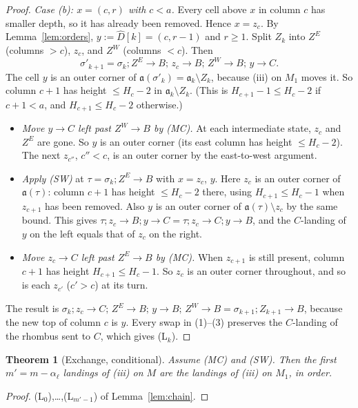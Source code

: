 \documentclass[11pt]{article}
\newtheorem{theorem}{Theorem}
\theoremstyle{definition}
\newcommand{\toB}{\!\to\! B}
\newcommand{\toC}{\!\to\! C}
\newcommand{\fa}{\mathfrak a}
\begin{document}
\begin{proof}
\noindent\emph{Case (b): $x=(c,r)$ with $c<a$.} Every cell above $x$ in column $c$ has smaller depth, so it has already been
removed. Hence $x=z_c$. By Lemma~\ref{lem:orders}, $y:=\hat D[k]=(c,r-1)$ and $r\ge1$. Split $Z_k$ into $Z^E$ (columns $>c$),
$z_c$, and $Z^W$ (columns $<c$). Then
\[\sigma'_{k+1}=\sigma_k;Z^E\toB;\,z_c\toB;\,Z^W\toB;\,y\toC .\]
The cell $y$ is an outer corner of $\fa(\sigma'_k)=\fa_k\setminus Z_k$, because (iii) on $M_1$ moves it. So column $c+1$ has
height $\le H_c-2$ in $\fa_k\setminus Z_k$. (This is $H_{c+1}-1\le H_c-2$ if $c+1<a$, and $H_{c+1}\le H_c-2$ otherwise.)
\begin{itemize}
\item[(1)] \emph{Move $y\toC$ left past $Z^W\toB$ by (MC).} At each intermediate state, $z_c$ and $Z^E$ are gone. So $y$ is an
outer corner (its east column has height $\le H_c-2$). The next $z_{c''}$, $c''<c$, is an outer corner by the east-to-west
argument.
\item[(2)] \emph{Apply (SW)} at $\tau=\sigma_k;Z^E\toB$ with $x=z_c$, $y$. Here $z_c$ is an outer corner of $\fa(\tau)$: column $c+1$
has height $\le H_c-2$ there, using $H_{c+1}\le H_c-1$ when $z_{c+1}$ has been removed. Also $y$ is an outer corner of
$\fa(\tau)\setminus z_c$ by the same bound. This gives $\tau;z_c\toB;y\toC=\tau;z_c\toC;y\toB$, and the $C$-landing of $y$ on the left equals that of $z_c$ on the right.
\item[(3)] \emph{Move $z_c\toC$ left past $Z^E\toB$ by (MC).} When $z_{c+1}$ is still present, column $c+1$ has height
$H_{c+1}\le H_c-1$. So $z_c$ is an outer corner throughout, and so is each $z_{c'}$ ($c'>c$) at its turn.
\end{itemize}
The result is $\sigma_k;z_c\toC;\,Z^E\toB;\,y\toB;\,Z^W\toB=\sigma_{k+1};Z_{k+1}\toB$, because the new top of column $c$
is $y$. Every swap in (1)--(3) preserves the $C$-landing of the rhombus sent to $C$, which gives (L$_k$).
\end{proof}

\begin{theorem}[Exchange, conditional]\label{thm:exchange}
Assume (MC) and (SW). Then the first $m'=m-\alpha_\ell$ landings of (iii) on $M$ are the landings of (iii) on $M_1$, in order.
\end{theorem}
\begin{proof}
(L$_0$),\dots,(L$_{m'-1}$) of Lemma~\ref{lem:chain}.
\end{proof}
\end{document}
